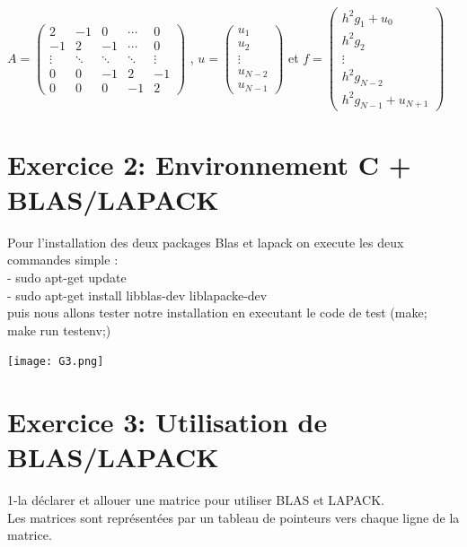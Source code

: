 \documentclass[12pt]{report}
\begin{document}
$A=\left(\begin{array}{ccccc}
	2 & -1 & 0 & \cdots & 0 \\
	-1 & 2 & -1 & \cdots & 0 \\
	\vdots & \ddots & \ddots & \ddots & \vdots \\
	0 & 0 & -1 & 2 & -1 \\
	0 & 0 & 0 & -1 & 2
\end{array}\right)$
, 
$u=\left(\begin{array}{c}
u_{1} \\
u_{2} \\
\vdots \\
u_{N-2} \\
u_{N-1}
\end{array}\right)$
et
$f=\left(\begin{array}{c}
h^{2}g_{1}+u_{0} \\
h^{2}g_{2} \\
\vdots \\
h^{2}g_{N-2} \\
h^{2}g_{N-1}+u_{N+1}
\end{array}\right)$
\newpage
\section{Exercice 2: Environnement C + BLAS/LAPACK}

Pour l'installation des deux packages Blas et lapack on execute les deux commandes simple :\\[0.2cm]
- sudo apt-get update\\
- sudo apt-get install libblas-dev liblapacke-dev\\


puis nous allons tester notre installation en executant le code de test (make; make run testenv;)
\begin{center}
\texttt{[image: G3.png]}~\\
\end{center}

\section{Exercice 3: Utilisation de BLAS/LAPACK}

1-la déclarer et allouer une matrice pour utiliser BLAS et LAPACK.\\[0.3cm]
Les matrices sont représentées par un tableau de pointeurs vers chaque ligne de la matrice.\\
\end{document}
